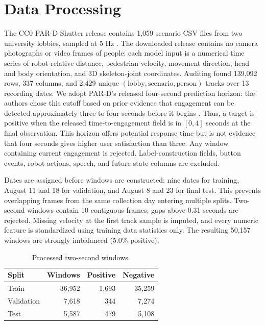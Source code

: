 \documentclass[final]{article}
\begin{document}
\section*{Data Processing}

The CC0 PAR-D Shutter release contains 1,059 scenario CSV files from two university lobbies, sampled at 5 Hz \citep{thompson2024pard}. The downloaded release contains no camera photographs or video frames of people: each model input is a numerical time series of robot-relative distance, pedestrian velocity, movement direction, head and body orientation, and 3D skeleton-joint coordinates. Auditing found 139,092 rows, 337 columns, and 2,429 unique $(\mathrm{lobby},\mathrm{scenario},\mathrm{person})$ tracks over 13 recording dates. We adopt PAR-D's released four-second prediction horizon: the authors chose this cutoff based on prior evidence that engagement can be detected approximately three to four seconds before it begins \citep{thompson2024pard,bohus2009engagement}. Thus, a target is positive when the released time-to-engagement field is in $[0,4]$ seconds at the final observation. This horizon offers potential response time but is not evidence that four seconds gives higher user satisfaction than three. Any window containing current engagement is rejected. Label-construction fields, button events, robot actions, speech, and future-state columns are excluded.

Dates are assigned before windows are constructed: nine dates for training, August 11 and 18 for validation, and August 8 and 23 for final test. This prevents overlapping frames from the same collection day entering multiple splits. Two-second windows contain 10 contiguous frames; gaps above 0.31 seconds are rejected. Missing velocity at the first track sample is imputed, and every numeric feature is standardized using training data statistics only. The resulting 50,157 windows are strongly imbalanced (5.0\% positive).

\begin{table}[!ht]
  \centering
  \small
  \caption{Processed two-second windows.}
  \label{tab:data}
  \begin{tabular}{lrrr}
    \toprule
    Split & Windows & Positive & Negative \\
    \midrule
    Train & 36,952 & 1,693 & 35,259 \\
    Validation & 7,618 & 344 & 7,274 \\
    Test & 5,587 & 479 & 5,108 \\
    \bottomrule
  \end{tabular}
\end{table}
\end{document}
